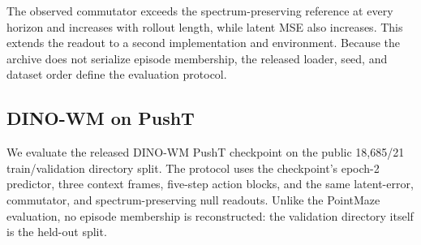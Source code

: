 \documentclass{article}
\begin{document}
\begin{table}[H]
\centering
\small
\setlength{\tabcolsep}{3pt}
\caption{DINO-WM on PointMaze. The same latent-error and covariance--operator readouts are applied to a different action-conditioned world-model implementation and environment.}
\label{tab:supp-dino-wm}
\end{table}

The observed commutator exceeds the spectrum-preserving reference at every
horizon and increases with rollout length, while latent MSE also increases.
This extends the readout to a second implementation and environment. Because
the archive does not serialize episode membership, the released loader, seed,
and dataset order define the evaluation protocol.

\subsection{DINO-WM on PushT}
\label{sec:supp-dino-wm-pusht}

We evaluate the released DINO-WM PushT checkpoint on the public 18,685/21
train/validation directory split. The protocol uses the checkpoint's
epoch-2 predictor, three context frames, five-step action blocks, and the same
latent-error, commutator, and spectrum-preserving null readouts. Unlike the
PointMaze evaluation, no episode membership is reconstructed: the validation
directory itself is the held-out split.

\begin{table}[H]
\centering
\small
\setlength{\tabcolsep}{3pt}
\caption{DINO-WM on the explicit PushT validation split. The
temporal/operator readouts are evaluated on the released action-conditioned
checkpoint with a serialized train/validation directory split.}
\label{tab:supp-dino-wm-pusht}
\end{table}
\end{document}
